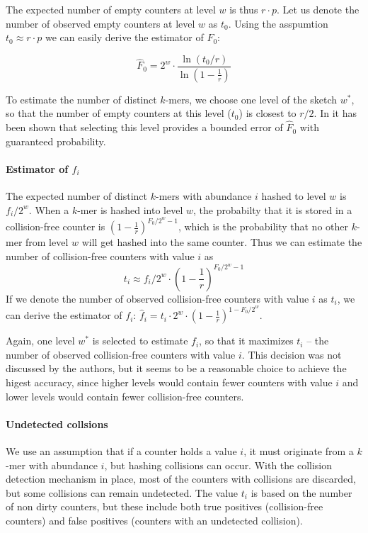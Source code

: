 The expected number of empty counters at level $w$ is thus $r \cdot p$. Let us denote the
number of observed empty counters at level $w$ as $t_0$. Using the asspumtion
$t_0 \approx r \cdot p$ we can easily derive the estimator of $F_0$:

$$ \hat F_0 = 2^w \cdot \frac{\ln(t_0/r)}{\ln\left(1 - \frac{1}{r}\right)} $$

To estimate the number of distinct $k$-mers, we choose one level of the sketch
$w^*$, so that the number of empty counters at this level ($t_0$) is closest to $r/2$.
In \cite{Melsted2014} it has been shown that selecting this level
provides a bounded error of $\hat F_0$ with guaranteed probability.

\paragraph{Estimator of $f_i$}
The expected number of distinct $k$-mers with abundance $i$ hashed to level $w$ is $f_i / 2^w$.
When a $k$-mer is hashed into level $w$, the probabilty that it is stored in a collision-free
counter is $(1 - \frac{1}{r})^{F_0/2^w - 1}$, which is the probability that no other $k$-mer 
from level $w$ will get hashed into the same counter. Thus we can estimate the number of
collision-free counters with value $i$ as 
\begin{equation} \label{eq:ti}
t_i \approx f_i / 2^w \cdot \left(1 - \frac{1}{r}\right)^{F_0/2^w - 1}
\end{equation}
If we denote the number of observed collision-free counters with value $i$ as $t_i$,
we can derive the estimator of $f_i$:
$\hat f_i = t_i \cdot 2^w \cdot \left(1 - \frac{1}{r}\right)^{1 - F_0/2^w}$.

Again, one level $w^*$ is selected to estimate $f_i$, so that it maximizes $t_i$ -- the number 
of observed collision-free counters with value $i$. This decision was not discussed by the authors,
but it seems to be a reasonable choice to achieve the higest accuracy, since higher levels
would contain fewer counters with value $i$ and lower levels would contain fewer
collision-free counters.

\paragraph{Undetected collsions}
We use an assumption that if a counter holds a value $i$, it must originate from a $k$-mer 
with abundance $i$, but hashing collisions can occur. With the collision detection mechanism
in place, most of the counters with collisions are discarded, but some collisions can remain
undetected. The value $t_i$ is based on the number of non dirty counters, but these include both
true positives (collision-free counters) and false positives (counters with an undetected
collision). 

